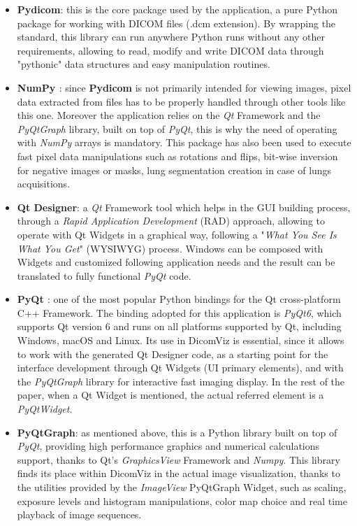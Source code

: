 \documentclass[conference]{IEEEtran}
\begin{document}
\begin{itemize}
    \item \textbf{Pydicom\cite{b5}}: this is the core package used by the application, a pure Python package for working with DICOM files (.dcm extension). By wrapping the standard, this library can run anywhere Python runs without any other requirements, allowing to read, modify and write DICOM data through "pythonic" data structures and easy manipulation routines.

    \item \textbf{NumPy \cite{b6}}: since \textbf{Pydicom} is not primarily intended for viewing images, pixel data extracted from files has to be properly handled through other tools like this one. Moreover the application relies on the  \textit{Qt} Framework and the  \textit{PyQtGraph} library, built on top of  \textit{PyQt}, this is why the need of operating with  \textit{NumPy} arrays is mandatory. This package has also been used to execute fast pixel data manipulations such as rotations and flips, bit-wise inversion for negative images or masks, lung segmentation creation in case of lungs acquisitions.

    \item \textbf{Qt Designer\cite{b7}}: a  \textit{Qt} Framework tool which helps in the GUI building process, through a  \textit{Rapid Application Development} (RAD) approach, allowing to operate with Qt Widgets in a graphical way, following a  "\textit{What You See Is What You Get}" (WYSIWYG) process. Windows can be composed with Widgets and customized following application needs and the result can be translated to fully functional  \textit{PyQt} code.

    \item \textbf{PyQt \cite{b8}}: one of the most popular Python bindings for the Qt cross-platform C++ Framework. The binding adopted for this application is  \textit{PyQt6}, which supports Qt version 6 and runs on all platforms supported by Qt, including Windows, macOS and Linux.
    Its use in DicomViz is essential, since it allows to work with the generated Qt Designer code, as a starting point for the interface development through Qt Widgets (UI primary elements), and with the  \textit{PyQtGraph} library for interactive fast imaging display. In the rest of the paper, when a Qt Widget is mentioned, the actual referred element is a  \textit{PyQtWidget}.

    \item \textbf{PyQtGraph\cite{b9}}: as mentioned above, this is a Python library built on top of  \textit{PyQt}, providing high performance graphics and numerical calculations support, thanks to Qt’s  \textit{GraphicsView} Framework and  \textit{Numpy}. This library finds its place within DicomViz in the actual image visualization, thanks to the utilities provided by the  \textit{ImageView} PyQtGraph Widget, such as scaling, exposure levels and histogram manipulations, color map choice and real time playback of image sequences.
\end{itemize}
\end{document}
